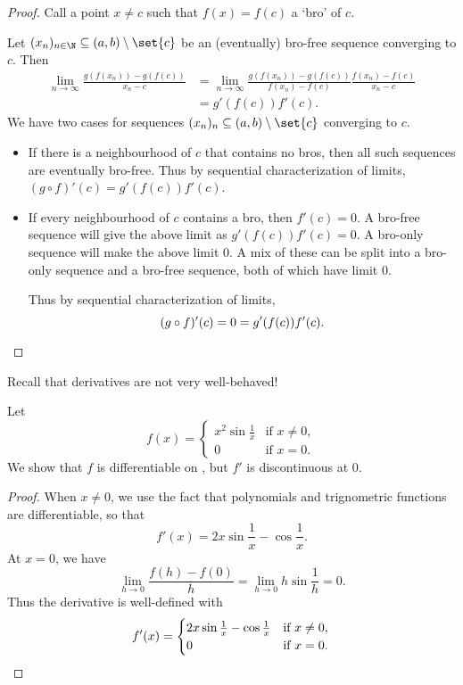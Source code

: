 \begin{proof}
    Call a point $x \ne c$ such that $f(x) = f(c)$ a `bro' of $c$.

    Let $(x_n)_{n \in \N} \subseteq (a, b) \setminus \set{c}$
    be an (eventually) bro-free sequence converging to $c$.
    Then \begin{align*}
        \lim_{n \to \infty} \frac{g(f(x_n)) - g(f(c))}{x_n - c}
            &= \lim_{n \to \infty} \frac{g(f(x_n)) - g(f(c))}{f(x_n) - f(c)}
                \frac{f(x_n) - f(c)}{x_n - c} \\
            &= g'(f(c)) f'(c).
    \end{align*}
    We have two cases for sequences
    $(x_n)_n \subseteq (a, b) \setminus \set{c}$ converging to $c$.
    \begin{itemize}
        \item If there is a neighbourhood of $c$ that contains no bros,
        then all such sequences are eventually bro-free.
        Thus by sequential characterization of limits,
        $(g \circ f)'(c) = g'(f(c)) f'(c)$.
        \item If every neighbourhood of $c$ contains a bro,
        then $f'(c) = 0$.
        A bro-free sequence will give the above limit as $g'(f(c))f'(c)=0$.
        A bro-only sequence will make the above limit $0$.
        A mix of these can be split into a bro-only sequence and a
        bro-free sequence, both of which have limit $0$.

        Thus by sequential characterization of limits, \[
            (g \circ f)'(c) = 0 = g'(f(c)) f'(c). \qedhere
        \]
    \end{itemize}
\end{proof}

Recall that derivatives are not very well-behaved!
\begin{example}
    Let \[
        f(x) = \begin{cases}
            x^2 \sin \frac1x & \text{if } x \ne 0, \\
            0 & \text{if } x = 0.
        \end{cases}
    \]
    We show that $f$ is differentiable on \R, but $f'$ is discontinuous
    at $0$.
    \begin{proof}
        When $x \ne 0$, we use the fact that polynomials and trignometric
        functions are differentiable, so that \[
            f'(x) = 2x \sin \frac1x - \cos \frac1x.
        \] At $x = 0$, we have \[
            \lim_{h \to 0} \frac{f(h) - f(0)}{h}
            = \lim_{h \to 0} h \sin \frac1h = 0.
        \] Thus the derivative is well-defined with \[
            f'(x) = \begin{cases}
                2x \sin \frac1x - \cos \frac1x & \text{if } x \ne 0, \\
                0 & \text{if } x = 0.
            \end{cases} \qedhere
        \]
    \end{proof}
\end{example}

